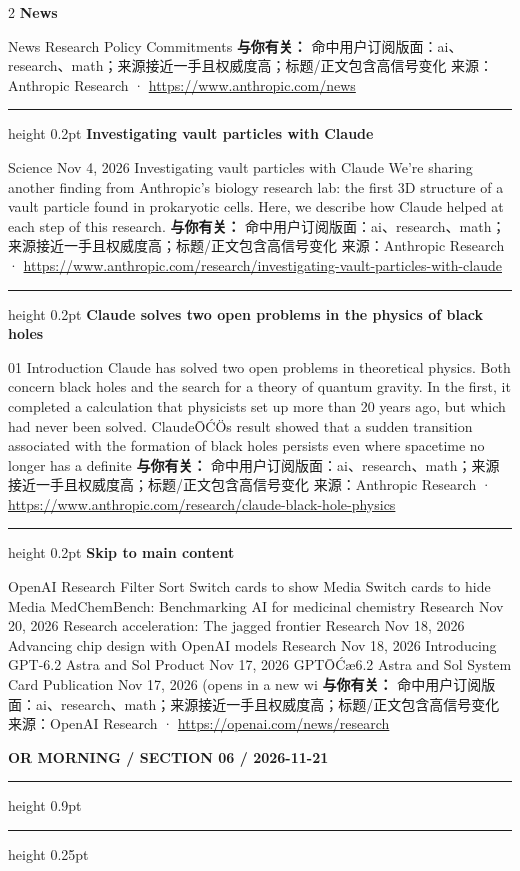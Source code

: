 \documentclass[10.5pt]{ctexart}
\begin{document}
\begin{multicols}{2}
{\large\bfseries News}\par
News Research Policy Commitments
\textbf{与你有关：} 命中用户订阅版面：ai、research、math；来源接近一手且权威度高；标题/正文包含高信号变化
{\footnotesize\color{ormuted} 来源：Anthropic Research · \url{https://www.anthropic.com/news}}
\vspace{2mm}
\hrule height 0.2pt
\vspace{2mm}
{\large\bfseries Investigating vault particles with Claude}\par
Science Nov 4, 2026 Investigating vault particles with Claude We’re sharing another finding from Anthropic’s biology research lab: the first 3D structure of a vault particle found in prokaryotic cells. Here, we describe how Claude helped at each step of this research.
\textbf{与你有关：} 命中用户订阅版面：ai、research、math；来源接近一手且权威度高；标题/正文包含高信号变化
{\footnotesize\color{ormuted} 来源：Anthropic Research · \url{https://www.anthropic.com/research/investigating-vault-particles-with-claude}}
\vspace{2mm}
\hrule height 0.2pt
\vspace{2mm}
{\large\bfseries Claude solves two open problems in the physics of black holes}\par
01 Introduction Claude has solved two open problems in theoretical physics. Both concern black holes and the search for a theory of quantum gravity. In the first, it completed a calculation that physicists set up more than 20 years ago, but which had never been solved. ClaudeŌĆÖs result showed that a sudden transition associated with the formation of black holes persists even where spacetime no longer has a definite 
\textbf{与你有关：} 命中用户订阅版面：ai、research、math；来源接近一手且权威度高；标题/正文包含高信号变化
{\footnotesize\color{ormuted} 来源：Anthropic Research · \url{https://www.anthropic.com/research/claude-black-hole-physics}}
\vspace{2mm}
\hrule height 0.2pt
\vspace{2mm}
{\large\bfseries Skip to main content}\par
OpenAI Research Filter Sort Switch cards to show Media Switch cards to hide Media MedChemBench: Benchmarking AI for medicinal chemistry Research Nov 20, 2026 Research acceleration: The jagged frontier Research Nov 18, 2026 Advancing chip design with OpenAI models Research Nov 18, 2026 Introducing GPT-6.2 Astra and Sol Product Nov 17, 2026 GPTŌĆæ6.2 Astra and Sol System Card Publication Nov 17, 2026 (opens in a new wi
\textbf{与你有关：} 命中用户订阅版面：ai、research、math；来源接近一手且权威度高；标题/正文包含高信号变化
{\footnotesize\color{ormuted} 来源：OpenAI Research · \url{https://openai.com/news/research}}
\end{multicols}
\newpage
{\small\bfseries OR MORNING / SECTION 06 / 2026-11-21}
\vspace{2mm}
\hrule height 0.9pt
\vspace{1.5mm}
\hrule height 0.25pt
\vspace{4mm}
\end{document}
